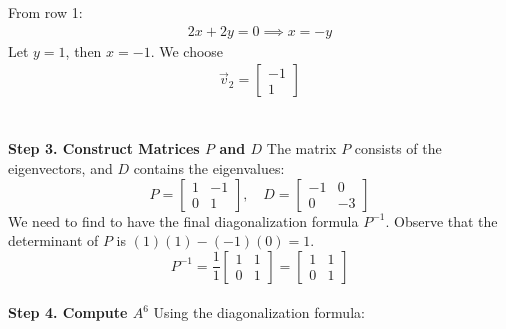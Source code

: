 \documentclass{article}
\begin{document}
From row 1:
\begin{align*}
	2x + 2y = 0 \implies x = -y
\end{align*}
Let $y=1$, then $x=-1$. We choose
\begin{align*}
	\vec{v}_{2} =
	\begin{bmatrix}
		-1 \\
		1
	\end{bmatrix}
\end{align*}
\\
\\
\textbf{Step 3. Construct Matrices $P$ and $D$}
The matrix $P$ consists of the eigenvectors, and $D$ contains the eigenvalues:
\[
	P = \begin{bmatrix} 1 & -1 \\ 0 & 1 \end{bmatrix}, \quad D = \begin{bmatrix} -1 & 0 \\ 0 & -3 \end{bmatrix}
\]
We need to find to have the final diagonalization formula $P^{-1}$. Observe that
the determinant of $P$ is $(1)(1) - (-1)(0) = 1$.
\[
	P^{-1} = \frac{1}{1} \begin{bmatrix} 1 & 1 \\ 0 & 1 \end{bmatrix} = \begin{bmatrix} 1 & 1 \\ 0 & 1 \end{bmatrix}
\]
\\
\textbf{Step 4. Compute $A^6$}
Using the diagonalization formula:
\end{document}
